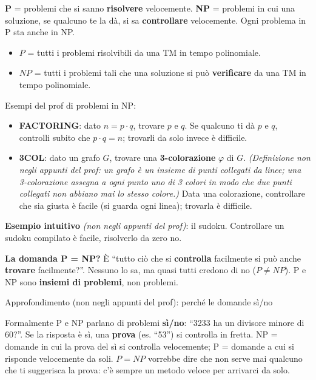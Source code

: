 \begin{inbreve}

\textbf{P} = problemi che si sanno \textbf{risolvere} velocemente. \textbf{NP} = problemi in cui una soluzione, se qualcuno te la dà, si sa \textbf{controllare} velocemente. Ogni problema in P sta anche in NP.

\end{inbreve}

\begin{itemize}
\tightlist
\item
  \(P\) = tutti i problemi risolvibili da una TM in tempo polinomiale.
\item
  \(NP\) = tutti i problemi tali che una soluzione si può \textbf{verificare} da una TM in tempo polinomiale.
\end{itemize}

Esempi del prof di problemi in NP:

\begin{itemize}
\tightlist
\item
  \textbf{FACTORING}: dato \(n = p \cdot q\), trovare \(p\) e \(q\). Se qualcuno ti dà \(p\) e \(q\), controlli subito che \(p \cdot q = n\); trovarli da solo invece è difficile.
\item
  \textbf{3COL}: dato un grafo \(G\), trovare una \textbf{3-colorazione} \(\varphi\) di \(G\). \emph{(Definizione non negli appunti del prof: un grafo è un insieme di punti collegati da linee; una 3-colorazione assegna a ogni punto uno di 3 colori in modo che due punti collegati non abbiano mai lo stesso colore.)} Data una colorazione, controllare che sia giusta è facile (si guarda ogni linea); trovarla è difficile.
\end{itemize}

\begin{esempio}

\textbf{Esempio intuitivo} \emph{(non negli appunti del prof)}: il sudoku. Controllare un sudoku compilato è facile, risolverlo da zero no.

\end{esempio}

\textbf{La domanda P = NP?} È ``tutto ciò che si \textbf{controlla} facilmente si può anche \textbf{trovare} facilmente?''. Nessuno lo sa, ma quasi tutti credono di no (\(P \neq NP\)). P e NP sono \textbf{insiemi di problemi}, non problemi.

\begin{approfondimento}{Approfondimento (non negli appunti del prof): perché le domande sì/no}

Formalmente P e NP parlano di problemi \textbf{sì/no}: ``3233 ha un divisore minore di 60?''. Se la risposta è sì, una \textbf{prova} (es. ``53'') si controlla in fretta. NP = domande in cui la prova del sì si controlla velocemente; P = domande a cui si risponde velocemente da soli. \(P = NP\) vorrebbe dire che non serve mai qualcuno che ti suggerisca la prova: c'è sempre un metodo veloce per arrivarci da solo.

\end{approfondimento}

